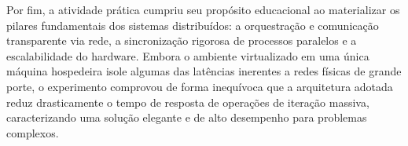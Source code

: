 \documentclass[
	12pt,
	oneside,
	a4paper,
	chapter=TITLE,
	section=TITLE,
	english,
	brazil,
	sumario=tradicional
]{abntex2}
\begin{document}
Por fim, a atividade prática cumpriu seu propósito educacional ao materializar os pilares fundamentais dos sistemas distribuídos: a orquestração e comunicação transparente via rede, a sincronização rigorosa de processos paralelos e a escalabilidade do hardware. Embora o ambiente virtualizado em uma única máquina hospedeira isole algumas das latências inerentes a redes físicas de grande porte, o experimento comprovou de forma inequívoca que a arquitetura adotada reduz drasticamente o tempo de resposta de operações de iteração massiva, caracterizando uma solução elegante e de alto desempenho para problemas complexos.

% 
\end{document}
